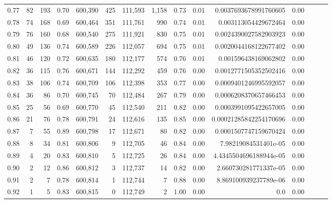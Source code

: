 \begin{tabular}{rrrrrrrrrrrrrrr}
0.77 &      82 &    193 &  0.70 &  600,390 &      425 &  111,593 &    1,158 &  0.73 &  0.01 &   0.0037693678991760605 &      0.00 \\
0.78 &      74 &    168 &  0.69 &  600,464 &      351 &  111,761 &      990 &  0.74 &  0.01 &    0.003113054429672464 &      0.00 \\
0.79 &      76 &    160 &  0.68 &  600,540 &      275 &  111,921 &      830 &  0.75 &  0.01 &   0.0024390027582903923 &      0.00 \\
0.80 &      49 &    136 &  0.74 &  600,589 &      226 &  112,057 &      694 &  0.75 &  0.01 &   0.0020044168122677402 &      0.00 \\
0.81 &      46 &    120 &  0.72 &  600,635 &      180 &  112,177 &      574 &  0.76 &  0.01 &    0.001596438169062802 &      0.00 \\
0.82 &      36 &    115 &  0.76 &  600,671 &      144 &  112,292 &      459 &  0.76 &  0.00 &   0.0012771505352502416 &      0.00 \\
0.83 &      38 &    106 &  0.74 &  600,709 &      106 &  112,398 &      353 &  0.77 &  0.00 &   0.0009401246995592057 &      0.00 \\
0.84 &      36 &     86 &  0.70 &  600,745 &       70 &  112,484 &      267 &  0.79 &  0.00 &   0.0006208370657466453 &      0.00 \\
0.85 &      25 &     56 &  0.69 &  600,770 &       45 &  112,540 &      211 &  0.82 &  0.00 &   0.0003991095422657005 &      0.00 \\
0.86 &      21 &     76 &  0.78 &  600,791 &       24 &  112,616 &      135 &  0.85 &  0.00 &  0.00021285842254170696 &      0.00 \\
0.87 &       7 &     55 &  0.89 &  600,798 &       17 &  112,671 &       80 &  0.82 &  0.00 &   0.0001507747159670424 &      0.00 \\
0.88 &       8 &     34 &  0.81 &  600,806 &        9 &  112,705 &       46 &  0.84 &  0.00 &    7.98219084531401e-05 &      0.00 \\
0.89 &       4 &     20 &  0.83 &  600,810 &        5 &  112,725 &       26 &  0.84 &  0.00 &  4.4345504696188944e-05 &      0.00 \\
0.90 &       2 &     12 &  0.86 &  600,812 &        3 &  112,737 &       14 &  0.82 &  0.00 &   2.660730281771337e-05 &      0.00 \\
0.91 &       2 &      7 &  0.78 &  600,814 &        1 &  112,744 &        7 &  0.88 &  0.00 &   8.869100939237789e-06 &      0.00 \\
0.92 &       1 &      5 &  0.83 &  600,815 &        0 &  112,749 &        2 &  1.00 &  0.00 &                     0.0 &      0.00 \\

\end{tabular}
